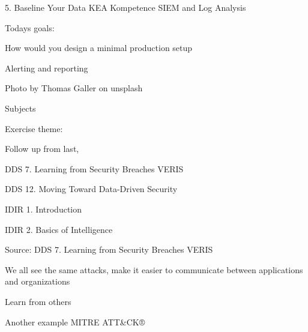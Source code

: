 \documentclass[Screen16to9,17pt]{foils}
\begin{document}
\mytitlepage
{5. Baseline Your Data}
{KEA Kompetence SIEM and Log Analysis}




Todays goals:
\begin{list2}
\item How would you design a minimal production setup
\item Alerting and reporting
\end{list2}

  Photo by Thomas Galler on unsplash


\begin{list1}
\item Subjects
\begin{list2}
\item
\end{list2}
\item Exercise theme:
\begin{list2}
\item
\end{list2}
\end{list1}

Follow up from last, 


\begin{list1}
\item DDS 7. Learning from Security Breaches VERIS
\item DDS 12. Moving Toward Data-Driven Security
\item IDIR 1. Introduction
\item IDIR 2. Basics of Intelligence
\end{list1}




\begin{quote}

\end{quote}

Source: DDS 7. Learning from Security Breaches VERIS
\begin{list2}
\item We all see the same attacks, make it easier to communicate between applications and organizations
\item Learn from others
\item Another example MITRE ATT\&CK® 
\end{list2}
\end{document}
